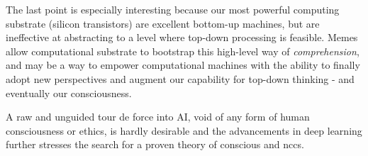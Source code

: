 \documentclass[a4paper,oneside]{memoir}
\begin{document}
The last point is especially interesting because our most powerful computing substrate
(silicon transistors) are excellent \gls{bottom-up} machines, but are ineffective at
abstracting to a level where \gls{top-down} processing is feasible. Memes
allow computational substrate to bootstrap this high-level way of 
\textit{comprehension}, and may be a way to empower computational machines with
the ability to finally adopt new perspectives and augment our capability for
\gls{top-down} thinking - and eventually our consciousness.

A raw and unguided tour de force into AI, void of any form of human consciousness or
ethics, is hardly desirable and the advancements in deep learning further stresses
the search for a proven theory of conscious and \gls{ncc}s.

\clearpage

\printglossary[Glossary]

\printbibliography
\end{document}
